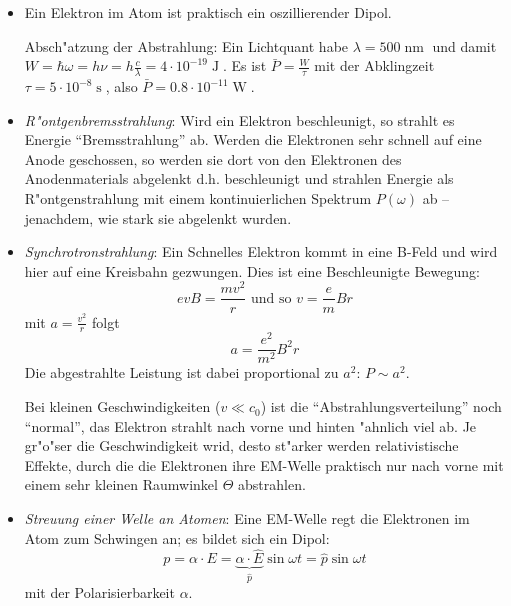 \begin{Beispiel}
   \begin{itemize}
   \item Ein Elektron im Atom ist praktisch ein oszillierender
      Dipol.

      Absch"atzung der Abstrahlung: Ein Lichtquant habe
      $\lambda = 500\operatorname{nm}$ und damit $W = \hbar \omega = h \nu
      = h\frac{c}{\lambda} = 4 \cdot 10^{-19}\operatorname{J}$.  Es
      ist $\bar P = \frac{W}{\tau}$ mit der Abklingzeit $\tau =
      5\cdot10^{-8}\operatorname{s}$, also $\bar P = 0.8 \cdot
      10^{-11}\operatorname{W}$.

   \item \emph{R"ontgenbremsstrahlung}:
      Wird ein Elektron beschleunigt, so strahlt es Energie
      "`Bremsstrahlung"' ab. Werden die
      Elektronen sehr schnell auf eine Anode geschossen, so werden sie
      dort von den Elektronen des Anodenmaterials abgelenkt
      d.h. beschleunigt und strahlen Energie als R"ontgenstrahlung mit
      einem kontinuierlichen Spektrum $P(\omega)$ ab -- jenachdem, wie
      stark sie abgelenkt wurden.
   \item \emph{Synchrotronstrahlung}: Ein
      Schnelles Elektron kommt in eine B-Feld und wird hier auf eine
      Kreisbahn gezwungen. Dies ist eine Beschleunigte Bewegung:
      \begin{equation*}
         evB = \frac{mv^2}{r} \text{ und so } v = \frac{e}{m} B r
      \end{equation*}
      mit $a = \frac{v^2}{r}$ folgt
      \begin{equation*}
         a = \frac{e^2}{m^2} B^2 r
      \end{equation*}
      Die abgestrahlte Leistung ist dabei proportional zu $a^2$: $P
      \sim a^2$.

      Bei kleinen Geschwindigkeiten ($v \ll c_0$) ist die
      "`Abstrahlungsverteilung"' noch "`normal"', das Elektron strahlt
      nach vorne und hinten "ahnlich viel ab. Je gr"o"ser die
      Geschwindigkeit wrid, desto st"arker werden relativistische
      Effekte, durch die die Elektronen ihre EM-Welle praktisch nur
      nach vorne mit einem sehr kleinen Raumwinkel $\Theta$ abstrahlen.


   \item \emph{Streuung einer Welle an Atomen}: Eine EM-Welle regt die
      Elektronen im Atom zum Schwingen an; es bildet sich ein Dipol:
      \begin{equation*}
         p = \alpha \cdot E = \underbrace{\alpha \cdot \hat E}_{\hat
           p} \sin \omega t = \hat p \sin \omega t
      \end{equation*}
      mit der Polarisierbarkeit $\alpha$.


\end{itemize}
\end{Beispiel}
